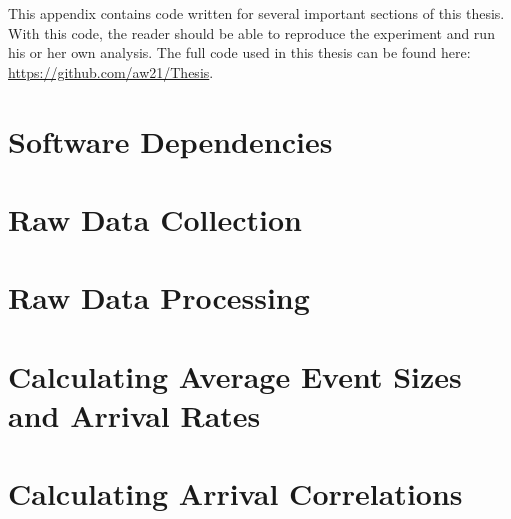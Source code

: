 This appendix contains code written for several important sections of this thesis. With this code, the reader should be able to reproduce the experiment and run his or her own analysis. The full code used in this thesis can be found here: \url{https://github.com/aw21/Thesis}.

\section{Software Dependencies}
\begin{singlespacing}

\end{singlespacing}

\section{Raw Data Collection}
\begin{singlespacing}
\label{data-collection-code}
\end{singlespacing}

\section{Raw Data Processing}
\begin{singlespacing}
\label{data-processing-code}
\end{singlespacing}

\section{Calculating Average Event Sizes and Arrival Rates}
\begin{singlespacing}
\label{AES_and_rate_code}
\end{singlespacing}

\section{Calculating Arrival Correlations}
\begin{singlespacing}
\label{correlation-code}
\end{singlespacing}

